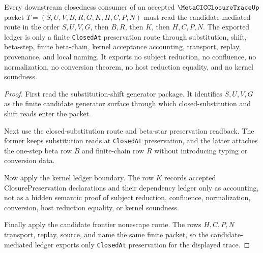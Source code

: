\begin{theorem}
\label{thm:metacicclosuretrace-candidate-mediated-closedness-ledger}
Every downstream closedness consumer of an accepted $\MetaCICClosureTraceUp$ packet $T=(S,U,V,B,R,G,K,H,C,P,N)$ must read the candidate-mediated route in the order $S,U,V,G$, then $B,R$, then $K$, then $H,C,P,N$. The exported ledger is only a finite \texttt{ClosedAt} preservation route through substitution, shift, beta-step, finite beta-chain, kernel acceptance accounting, transport, replay, provenance, and local naming. It exports no subject reduction, no confluence, no normalization, no conversion theorem, no host reduction equality, and no kernel soundness.
\end{theorem}
\begin{proof}
First read the substitution-shift generator package. It identifies $S,U,V,G$ as the finite candidate generator surface through which closed-substitution and shift reads enter the packet.

Next use the closed-substitution route and beta-star preservation readback. The former keeps substitution reads at \texttt{ClosedAt} preservation, and the latter attaches the one-step beta row $B$ and finite-chain row $R$ without introducing typing or conversion data.

Now apply the kernel ledger boundary. The row $K$ records accepted ClosurePreservation declarations and their dependency ledger only as accounting, not as a hidden semantic proof of subject reduction, confluence, normalization, conversion, host reduction equality, or kernel soundness.

Finally apply the candidate frontier nonescape route. The rows $H,C,P,N$ transport, replay, source, and name the same finite packet, so the candidate-mediated ledger exports only \texttt{ClosedAt} preservation for the displayed trace.
\end{proof}

